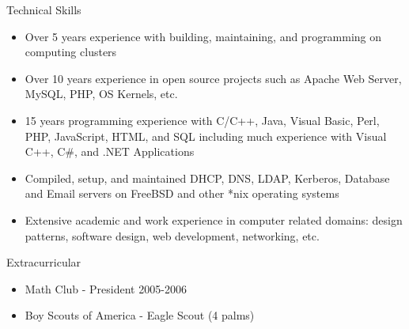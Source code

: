 \documentclass[10pt]{article}
\begin{document}
\begin{cv}
\begin{cvlist}{Technical Skills}
\item
\begin{itemize}\itemsep=0.25em
	\item Over 5 years experience with building, maintaining, and programming on computing clusters
	\item Over 10 years experience in open source projects such as Apache Web Server, MySQL, PHP, OS Kernels, etc.
	\item 15 years programming experience with C/C++, Java, Visual Basic, Perl, PHP, JavaScript,
		HTML, and SQL including much experience with Visual C++, C\#, and .NET Applications
	\item Compiled, setup, and maintained DHCP, DNS, LDAP, Kerberos, Database and Email servers on
		FreeBSD and other *nix operating systems
	\item Extensive academic and work experience in computer related domains: design patterns,
		software design, web development, networking, etc.
\end{itemize}
\end{cvlist}

\begin{cvlist}{Extracurricular}
\item
\begin{itemize}\itemsep=0.25em
	\item Math Club - President 2005-2006
	\item Boy Scouts of America - Eagle Scout (4 palms)
\end{itemize}
\end{cvlist}

\end{cv}
\end{document}

